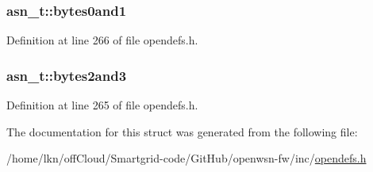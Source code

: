\subsubsection[{\texorpdfstring{bytes0and1}{bytes0and1}}]{ asn\+\_\+t\+::bytes0and1}\hypertarget{structasn__t_a9d2a032fe9b1adf08fc25d1cc73e8745}{}\label{structasn__t_a9d2a032fe9b1adf08fc25d1cc73e8745}


Definition at line 266 of file opendefs.\+h.

\subsubsection[{\texorpdfstring{bytes2and3}{bytes2and3}}]{ asn\+\_\+t\+::bytes2and3}\hypertarget{structasn__t_ae7a99f086ee6e28c6c72e248b6041b95}{}\label{structasn__t_ae7a99f086ee6e28c6c72e248b6041b95}


Definition at line 265 of file opendefs.\+h.



The documentation for this struct was generated from the following file\+:\begin{DoxyCompactItemize}
\item 
/home/lkn/off\+Cloud/\+Smartgrid-\/code/\+Git\+Hub/openwsn-\/fw/inc/\hyperlink{opendefs_8h}{opendefs.\+h}\end{DoxyCompactItemize}
